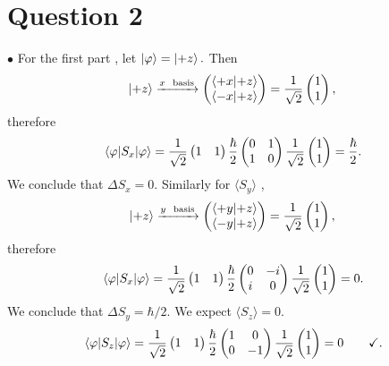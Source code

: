 \documentclass[12pt]{article}
\newcommand{\la}{\langle}
\newcommand{\ra}{\rangle}
\theoremstyle{definition}
\theoremstyle{definition}
\theoremstyle{definition}
\theoremstyle{definition}
\theoremstyle{definition}
\theoremstyle{example}
\theoremstyle{note}
\theoremstyle{remark}
\theoremstyle{example}
\begin{document}
		\section*{Question 2}
			$\bullet$ For the first part , let $\ket{\varphi} = \ket{+z}.$ Then 
			$$ \ket{+z} \xrightarrow{x \ \text{ basis}} \begin{pmatrix}
				\braket{+x}{+z} \\ \braket{-x}{+z}
			\end{pmatrix} = \frac{1}{\sqrt{2}} \begin{pmatrix}
				1 \\ 1
			\end{pmatrix},$$
			therefore 
			$$ \mel{\varphi}{S_{x}}{\varphi} = \frac{1}{\sqrt{2}} \begin{pmatrix}
				1 & 1
			\end{pmatrix} \frac{\hbar}{2} \begin{pmatrix}
				0 & 1 \\
				1 &  0
			\end{pmatrix}\frac{1}{\sqrt{2}} \begin{pmatrix}
			1 \\ 1
			\end{pmatrix} = \frac{\hbar}{2}.$$
			We conclude that $\Delta S_{x} = 0.$
			 Similarly for $\la S_{y} \ra$ , 
			$$ \ket{+z} \xrightarrow{y \ \text{ basis}} \begin{pmatrix}
			\braket{+y}{+z} \\ \braket{-y}{+z}
			\end{pmatrix} = \frac{1}{\sqrt{2}} \begin{pmatrix}
			1 \\ 1
			\end{pmatrix},$$
			therefore 
			 $$ \mel{\varphi}{S_{x}}{\varphi} = \frac{1}{\sqrt{2}} \begin{pmatrix}
			 1 & 1
			 \end{pmatrix} \frac{\hbar}{2} \begin{pmatrix}
			 0 & -i \\
			 i &  0
			 \end{pmatrix}\frac{1}{\sqrt{2}} \begin{pmatrix}
			 1 \\ 1
			 \end{pmatrix} = 0.$$
			 We conclude that $\Delta S_{y} = \hbar/2.$
			 We expect $\la S_{z} \ra =0$. 
			 $$ \mel{\varphi}{S_{z}}{\varphi} = \frac{1}{\sqrt{2}} \begin{pmatrix}
			 1 & 1
			 \end{pmatrix} \frac{\hbar}{2} \begin{pmatrix}
			 1 & 0 \\
			 0 & -1
			 \end{pmatrix}\frac{1}{\sqrt{2}} \begin{pmatrix}
			 1 \\ 1
			 \end{pmatrix} = 0 \qquad \checkmark.$$
			
\end{document}
